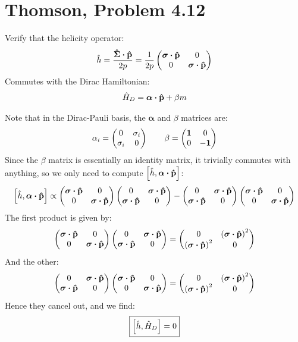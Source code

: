 \documentclass[12pt]{article}
\begin{document}
\section{Thomson, Problem 4.12}
\begin{problem}
  Verify that the helicity operator:
  \begin{align*}
    \hat{h}=\frac{\vu{\Sigma}\vdot\vu{p}}{2p}=\frac1{2p}\pmqty{\bm{\sigma}\vdot\vu{p}&0\\0&\bm{\sigma}\vdot\vu{p}}
  \end{align*}
  Commutes with the Dirac Hamiltonian:
  \begin{align*}
    \hat{H}_D=\bm{\alpha}\vdot\vu{p}+\beta m
  \end{align*}
\end{problem}
Note that in the Dirac-Pauli basis, the $\bm{\alpha}$ and $\beta$ matrices are:
\begin{align*}
  \alpha_i=\pmqty{0&\sigma_i\\\sigma_i&0}\qquad
  \beta=\pmqty{\bm{1}&0\\0&-\bm{1}}
\end{align*}
Since the $\beta$ matrix is essentially an identity matrix, it trivially commutes with anything, so we only need to compute $\comm{\hat{h}}{\bm{\alpha}\vdot\vu{p}}$:
\begin{align*}
  \comm{\hat{h}}{\bm{\alpha}\vdot\vu{p}}\propto
  \pmqty{\bm{\sigma}\vdot\vu{p}&0\\0&\bm{\sigma}\vdot\vu{p}}
  \pmqty{0&\bm{\sigma}\vdot\vu{p}\\\bm{\sigma}\vdot\vu{p}&0}-
  \pmqty{0&\bm{\sigma}\vdot\vu{p}\\\bm{\sigma}\vdot\vu{p}&0}
  \pmqty{\bm{\sigma}\vdot\vu{p}&0\\0&\bm{\sigma}\vdot\vu{p}}
\end{align*}
The first product is given by:
\begin{align*}
  \pmqty{\bm{\sigma}\vdot\vu{p}&0\\0&\bm{\sigma}\vdot\vu{p}}
  \pmqty{0&\bm{\sigma}\vdot\vu{p}\\\bm{\sigma}\vdot\vu{p}&0}
  =\pmqty{0&{(\bm{\sigma}\vdot\vu{p})}^2\\{(\bm{\sigma}\vdot\vu{p})}^2&0}
\end{align*}
And the other:
\begin{align*}
  \pmqty{0&\bm{\sigma}\vdot\vu{p}\\\bm{\sigma}\vdot\vu{p}&0}
  \pmqty{\bm{\sigma}\vdot\vu{p}&0\\0&\bm{\sigma}\vdot\vu{p}}
  =\pmqty{0&{(\bm{\sigma}\vdot\vu{p})}^2\\{(\bm{\sigma}\vdot\vu{p})}^2&0}
\end{align*}
Hence they cancel out, and we find:
\begin{equation}
  \label{eq:p5}
  \boxed{\comm{\hat{h}}{\hat{H}_D}=0}
\end{equation}
\newpage
\end{document}
